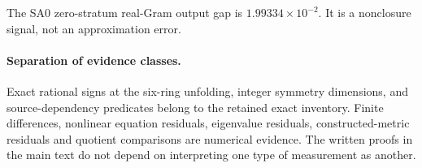 The SA0 zero-stratum real-Gram output gap is \(1.99334\times10^{-2}\). It is a nonclosure signal, not an approximation error.

\paragraph{Separation of evidence classes.}
Exact rational signs at the six-ring unfolding, integer symmetry dimensions,
and source-dependency predicates belong to the retained exact inventory.
Finite differences, nonlinear equation residuals, eigenvalue residuals,
constructed-metric residuals and quotient comparisons are numerical evidence.
The written proofs in the main text do not depend on interpreting one type
of measurement as another.
